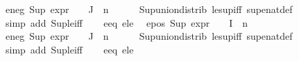 \begin{isabellebody}
\ e{}{\isacharunderscore}{\kern0pt}neg{\isacharcolon}{\kern0pt}\ {\isachardoublequoteopen}Sup\ {\isacharparenleft}{\kern0pt}{\isacharparenleft}{\kern0pt}expr{\isacharunderscore}{\kern0pt}{}\ {\isasymcirc}\ {\isasymPhi}{\isacharparenright}{\kern0pt}\ {\isacharbackquote}{\kern0pt}\ J{\isacharparenright}{\kern0pt}\ {\isacharless}{\kern0pt}{\isacharequal}{\kern0pt}\ n{}{\isachardoublequoteclose}\isanewline
\ \ \ \ \isamarkupfalse%
\ Sup{\isacharunderscore}{\kern0pt}union{\isacharunderscore}{\kern0pt}distrib\ le{\isacharunderscore}{\kern0pt}sup{\isacharunderscore}{\kern0pt}iff\ sup{\isacharunderscore}{\kern0pt}enat{\isacharunderscore}{\kern0pt}def\isanewline
\ \ \ \ \isamarkupfalse%
\ {\isacharparenleft}{\kern0pt}simp\ add{\isacharcolon}{\kern0pt}\ Sup{\isacharunderscore}{\kern0pt}le{\isacharunderscore}{\kern0pt}iff{\isacharparenright}{\kern0pt}{\isacharplus}{\kern0pt}\isanewline
\isanewline
\ \ \isamarkupfalse%
\ e{}{\isacharunderscore}{\kern0pt}eq\ e{}{\isacharunderscore}{\kern0pt}le\ \isamarkupfalse%
\ e{}{\isacharunderscore}{\kern0pt}pos{\isacharcolon}{\kern0pt}\ {\isachardoublequoteopen}Sup\ {\isacharparenleft}{\kern0pt}{\isacharparenleft}{\kern0pt}expr{\isacharunderscore}{\kern0pt}{}\ {\isasymcirc}\ {\isasymPhi}{\isacharparenright}{\kern0pt}\ {\isacharbackquote}{\kern0pt}\ I{\isacharparenright}{\kern0pt}\ {\isasymle}\ n{}{\isachardoublequoteclose}\isanewline
{}\ e{}{\isacharunderscore}{\kern0pt}neg{\isacharcolon}{\kern0pt}\ {\isachardoublequoteopen}Sup\ {\isacharparenleft}{\kern0pt}{\isacharparenleft}{\kern0pt}expr{\isacharunderscore}{\kern0pt}{}\ {\isasymcirc}\ {\isasymPhi}{\isacharparenright}{\kern0pt}\ {\isacharbackquote}{\kern0pt}\ J{\isacharparenright}{\kern0pt}\ {\isasymle}\ n{}{\isachardoublequoteclose}\isanewline
\ \ \ \ \isamarkupfalse%
\ Sup{\isacharunderscore}{\kern0pt}union{\isacharunderscore}{\kern0pt}distrib\ le{\isacharunderscore}{\kern0pt}sup{\isacharunderscore}{\kern0pt}iff\ sup{\isacharunderscore}{\kern0pt}enat{\isacharunderscore}{\kern0pt}def\isanewline
\ \ \ \ \isamarkupfalse%
\ {\isacharparenleft}{\kern0pt}simp\ add{\isacharcolon}{\kern0pt}\ Sup{\isacharunderscore}{\kern0pt}le{\isacharunderscore}{\kern0pt}iff{\isacharparenright}{\kern0pt}{\isacharplus}{\kern0pt}\isanewline
\isanewline
\ \ \isamarkupfalse%
\ e{}{\isacharunderscore}{\kern0pt}eq\ e{}{\isacharunderscore}{\kern0pt}le\ \isamarkupfalse%

\end{isabellebody}
